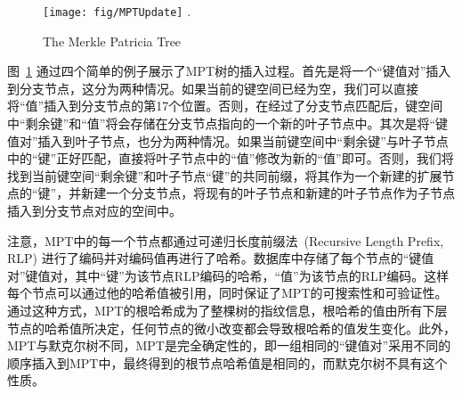 \begin{figure}[t]
\centering
\texttt{[image: fig/MPTUpdate]}
\DeclareGraphicsExtensions.
\caption{The Merkle Patricia Tree}
\label{fig:MPTUpdate}
\end{figure}

图~\ref{fig:MPTUpdate} 通过四个简单的例子展示了MPT树的插入过程。首先是将一个“键值对”插入到分支节点，这分为两种情况。如果当前的键空间已经为空，我们可以直接将“值”插入到分支节点的第17个位置。否则，在经过了分支节点匹配后，键空间中“剩余键”和“值”将会存储在分支节点指向的一个新的叶子节点中。其次是将“键值对”插入到叶子节点，也分为两种情况。如果当前键空间中“剩余键”与叶子节点中的“键”正好匹配，直接将叶子节点中的“值”修改为新的“值”即可。否则，我们将找到当前键空间“剩余键”和叶子节点“键”的共同前缀，将其作为一个新建的扩展节点的“键”，并新建一个分支节点，将现有的叶子节点和新建的叶子节点作为子节点插入到分支节点对应的空间中。

注意，MPT中的每一个节点都通过可递归长度前缀法~\cite{RLP_code}(Recursive Length Prefix, RLP) 进行了编码并对编码值再进行了哈希。数据库中存储了每个节点的“键值对”键值对，其中“键”为该节点RLP编码的哈希，“值”为该节点的RLP编码。这样每个节点可以通过他的哈希值被引用，同时保证了MPT的可搜索性和可验证性。通过这种方式，MPT的根哈希成为了整棵树的指纹信息，根哈希的值由所有下层节点的哈希值所决定，任何节点的微小改变都会导致根哈希的值发生变化。此外，MPT与默克尔树不同，MPT是完全确定性的，即一组相同的“键值对”采用不同的顺序插入到MPT中，最终得到的根节点哈希值是相同的，而默克尔树不具有这个性质。




